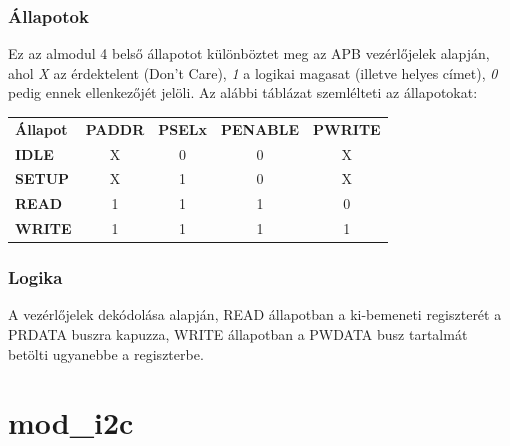 \subsubsection{Állapotok}
    Ez az almodul 4 belső állapotot különböztet meg az APB vezérlőjelek alapján, ahol \emph{X} az érdektelent (Don't Care), \emph{1}  a logikai magasat (illetve helyes címet), \emph{0}  pedig ennek ellenkezőjét jelöli. Az alábbi táblázat szemlélteti az állapotokat:\\[2ex]

    \begin{tabular}{l|c|c|c|c}
        \textbf{Állapot}& \textbf{PADDR} & \textbf{PSELx} & \textbf{PENABLE}   & \textbf{PWRITE}    \\
        \textbf{IDLE}   &   X            & 0              & 0                  & X                  \\
        \textbf{SETUP}  &   X            & 1              & 0                  & X                  \\
        \textbf{READ}   &   1            & 1              & 1                  & 0                  \\
        \textbf{WRITE}  &   1            & 1              & 1                  & 1
    \end{tabular}

\subsubsection{Logika}
    A vezérlőjelek dekódolása alapján, READ állapotban a ki-bemeneti regiszterét a PRDATA buszra kapuzza, WRITE állapotban a PWDATA busz tartalmát betölti ugyanebbe a regiszterbe.


\section{mod\_i2c}
